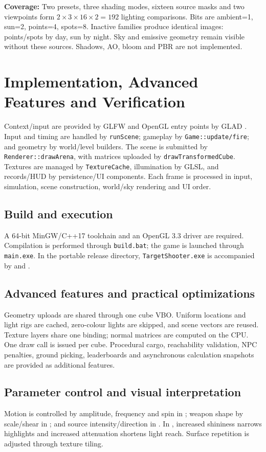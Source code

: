 \textbf{Coverage:} Two presets, three shading modes, sixteen source masks and two viewpoints form $2\times3\times16\times2=192$ lighting comparisons. Bits are ambient=1, sun=2, points=4, spots=8. Inactive families produce identical images: points/spots by day, sun by night. Sky and emissive geometry remain visible without these sources. Shadows, AO, bloom and PBR are not implemented.

\section{Implementation, Advanced Features and Verification}
Context/input are provided by GLFW and OpenGL entry points by GLAD \cite{glfw}. Input and timing are handled by \texttt{runScene}; gameplay by \texttt{Game::update/fire}; and geometry by world/level builders. The scene is submitted by \texttt{Renderer::drawArena}, with matrices uploaded by \texttt{drawTransformedCube}. Textures are managed by \texttt{TextureCache}, illumination by GLSL, and records/HUD by persistence/UI components. Each frame is processed in input, simulation, scene construction, world/sky rendering and UI order.
\subsection{Build and execution}
A 64-bit MinGW/C++17 toolchain and an OpenGL 3.3 driver are required. Compilation is performed through \texttt{build.bat}; the game is launched through \texttt{main.exe}. In the portable release directory, \texttt{TargetShooter.exe} is accompanied by  and .
\subsection{Advanced features and practical optimizations}
Geometry uploads are shared through one cube VBO. Uniform locations and light rigs are cached, zero-colour lights are skipped, and scene vectors are reused. Texture layers share one binding; normal matrices are computed on the CPU. One draw call is issued per cube. Procedural cargo, reachability validation, NPC penalties, ground picking, leaderboards and asynchronous calculation snapshots are provided as additional features.
\subsection{Parameter control and visual interpretation}
Motion is controlled by amplitude, frequency and spin in ; weapon shape by scale/shear in ; and source intensity/direction in . In , increased shininess narrows highlights and increased attenuation shortens light reach. Surface repetition is adjusted through texture tiling.

